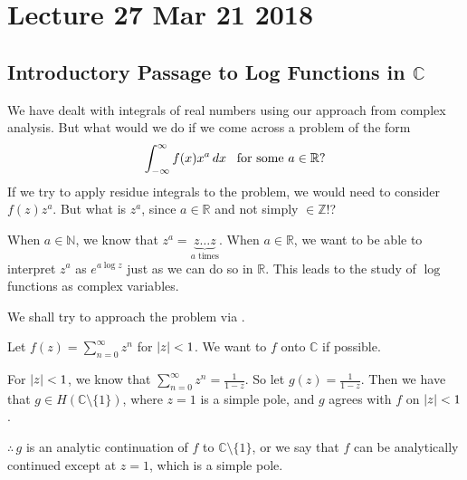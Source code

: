 \documentclass[11pt, oneside]{book}
\begin{document}



\chapter{Lecture 27 Mar 21 2018}
  \label{chapter:lecture_27_mar_21_2018}

\section{Introductory Passage to Log Functions in \texorpdfstring{$\mathbb{C}$}{C}} %
\label{sec:introductory_passage_to_log_functions_in_c}

We have dealt with integrals of real numbers using our approach from complex analysis. But what would we do if we come across a problem of the form
\begin{equation*}
  \int_{-\infty}^{\infty} f(x) x^a \mathop{}\!d{x} \enspace \text{ for some } a \in \mathbb{R}?
\end{equation*}
If we try to apply residue integrals to the problem, we would need to consider $f(z) z^a$. But what is $z^a$, since $a \in \mathbb{R}$ and not simply $\in \mathbb{Z}$!?

When $a \in \mathbb{N}$, we know that $z^a = \underbrace{z \hdots z}_{a \text{ times}}$. When $a \in \mathbb{R}$, we want to be able to interpret $z^a$ as $e^{a \log z}$ just as we can do so in $\mathbb{R}$. This leads to the study of $\log$ functions as complex variables.

We shall try to approach the problem via .

\begin{ex}
  Let $f(z) = \sum_{n=0}^{\infty} z^n$ for $\left|z\right| < 1$. We want to  $f$ onto $\mathbb{C}$ if possible.

  For $\left|z\right| < 1$, we know that $\sum_{n=0}^{\infty} z^n = \frac{1}{1 - z}$. So let $g(z) = \frac{1}{1 - z}$. Then we have that $g \in H(\mathbb{C} \setminus \{1\} )$, where $z = 1$ is a simple pole, and $g$ agrees with $f$ on $\left|z\right| < 1$.

  $\therefore \, g$ is an analytic continuation of $f$ to $\mathbb{C} \setminus \{1\}$, or we say that $f$ can be analytically continued except at $z = 1$, which is a simple pole.
\end{ex}
\end{document}
